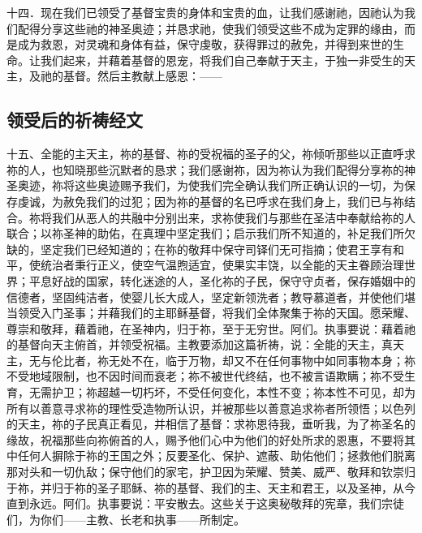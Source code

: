 十四．现在我们已领受了基督宝贵的身体和宝贵的血，让我们感谢祂，因祂认为我们配得分享这些祂的神圣奥迹；并恳求祂，使我们领受这些不成为定罪的缘由，而是成为救恩，对灵魂和身体有益，保守虔敬，获得罪过的赦免，并得到来世的生命。让我们起来，并藉着基督的恩宠，将我们自己奉献于天主，于独一非受生的天主，及祂的基督。然后主教献上感恩：——\par


\subsection{领受后的祈祷经文}

十五、全能的主天主，祢的基督、祢的受祝福的圣子的父，祢倾听那些以正直呼求祢的人，也知晓那些沉默者的恳求；我们感谢祢，因为祢认为我们配得分享祢的神圣奥迹，祢将这些奥迹赐予我们，为使我们完全确认我们所正确认识的一切，为保存虔诚，为赦免我们的过犯；因为祢的基督的名已呼求在我们身上，我们已与祢结合。祢将我们从恶人的共融中分别出来，求祢使我们与那些在圣洁中奉献给祢的人联合；以祢圣神的助佑，在真理中坚定我们；启示我们所不知道的，补足我们所欠缺的，坚定我们已经知道的；在祢的敬拜中保守司铎们无可指摘；使君王享有和平，使统治者秉行正义，使空气温煦适宜，使果实丰饶，以全能的天主眷顾治理世界；平息好战的国家，转化迷途的人，圣化祢的子民，保守守贞者，保存婚姻中的信德者，坚固纯洁者，使婴儿长大成人，坚定新领洗者；教导慕道者，并使他们堪当领受入门圣事；并藉我们的主耶稣基督，将我们全体聚集于祢的天国。愿荣耀、尊崇和敬拜，藉着祂，在圣神内，归于祢，至于无穷世。阿们。执事要说：藉着祂的基督向天主俯首，并领受祝福。主教要添加这篇祈祷，说：全能的天主，真天主，无与伦比者，祢无处不在，临于万物，却又不在任何事物中如同事物本身；祢不受地域限制，也不因时间而衰老；祢不被世代终结，也不被言语欺瞒；祢不受生育，无需护卫；祢超越一切朽坏，不受任何变化，本性不变；祢本性不可见，却为所有以善意寻求祢的理性受造物所认识，并被那些以善意追求祢者所领悟；以色列的天主，祢的子民真正看见，并相信了基督：求祢恩待我，垂听我，为了祢圣名的缘故，祝福那些向祢俯首的人，赐予他们心中为他们的好处所求的恩惠，不要将其中任何人摒除于祢的王国之外；反要圣化、保护、遮蔽、助佑他们；拯救他们脱离那对头和一切仇敌；保守他们的家宅，护卫因为荣耀、赞美、威严、敬拜和钦崇归于祢，并归于祢的圣子耶稣、祢的基督、我们的主、天主和君王，以及圣神，从今直到永远。阿们。执事要说：平安散去。这些关于这奥秘敬拜的宪章，我们宗徒们，为你们——主教、长老和执事——所制定。\par

